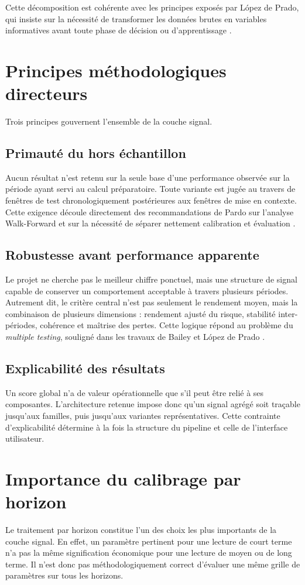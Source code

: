 Cette décomposition est cohérente avec les principes exposés par López de Prado,
qui insiste sur la nécessité de transformer les données brutes en variables
informatives avant toute phase de décision ou d'apprentissage \cite{deprado2018}.

\section{Principes méthodologiques directeurs}
Trois principes gouvernent l'ensemble de la couche signal.

\subsection{Primauté du hors échantillon}
Aucun résultat n'est retenu sur la seule base d'une performance observée sur la
période ayant servi au calcul préparatoire. Toute variante est jugée au travers
de fenêtres de test chronologiquement postérieures aux fenêtres de mise en
contexte. Cette exigence découle directement des recommandations de Pardo sur
l'analyse Walk-Forward et sur la nécessité de séparer nettement calibration et
évaluation \cite{pardo2008}.

\subsection{Robustesse avant performance apparente}
Le projet ne cherche pas le meilleur chiffre ponctuel, mais une structure de
signal capable de conserver un comportement acceptable à travers plusieurs
périodes. Autrement dit, le critère central n'est pas seulement le rendement
moyen, mais la combinaison de plusieurs dimensions : rendement ajusté du risque,
stabilité inter-périodes, cohérence et maîtrise des pertes. Cette logique répond
au problème du \emph{multiple testing}, souligné dans les travaux de Bailey et
López de Prado \cite{bailey2014}.

\subsection{Explicabilité des résultats}
Un score global n'a de valeur opérationnelle que s'il peut être relié à ses
composantes. L'architecture retenue impose donc qu'un signal agrégé soit
traçable jusqu'aux familles, puis jusqu'aux variantes représentatives. Cette
contrainte d'explicabilité détermine à la fois la structure du pipeline et celle
de l'interface utilisateur.

\section{Importance du calibrage par horizon}
Le traitement par horizon constitue l'un des choix les plus importants de la
couche signal. En effet, un paramètre pertinent pour une lecture de court terme
n'a pas la même signification économique pour une lecture de moyen ou de long
terme. Il n'est donc pas méthodologiquement correct d'évaluer une même grille de
paramètres sur tous les horizons.

